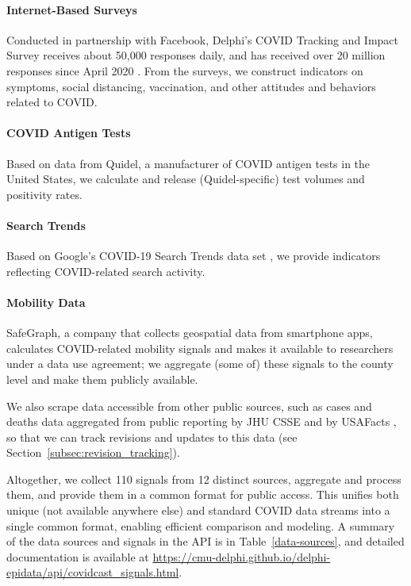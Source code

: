 \documentclass[9pt,twocolumn,twoside,lineno]{pnas-new}
\begin{document}
\paragraph{Internet-Based Surveys} Conducted in partnership with Facebook,
Delphi's COVID Tracking and Impact Survey receives about 50,000 responses daily,  
and has received over 20 million responses since April 2020 \cite{DelphiSurvey,
  Kreuter:2020}. From the surveys, we construct indicators on symptoms, social 
distancing, vaccination, and other attitudes and behaviors related to COVID.

\paragraph{COVID Antigen Tests} Based on data from Quidel, a manufacturer of
COVID antigen tests in the United States, we calculate and release
(Quidel-specific) test volumes and positivity rates.  

\paragraph{Search Trends} Based on Google's COVID-19 Search Trends data set
\cite{GoogleSymptoms}, we provide indicators reflecting COVID-related search  
activity.

\paragraph{Mobility Data} SafeGraph, a company that collects geospatial data
from smartphone apps, calculates COVID-related mobility signals
\cite{SafeGraphSD, SafeGraphPatterns} and makes it available to researchers
under a data use agreement; we aggregate (some of) these signals to the county
level and make them publicly available.     

\medskip
We also scrape data accessible from other public sources, such as cases and
deaths data aggregated from public reporting by JHU CSSE \cite{Dong:2020} and by
USAFacts \cite{USAFacts}, so that we can track revisions and updates to this data
(see Section~\ref{subsec:revision_tracking}).

Altogether, we collect 110 signals from 12 distinct sources, aggregate and
process them, and provide them in a common format for public access. This
unifies both unique (not available anywhere else) and standard COVID data
streams into a single common format, enabling efficient comparison and modeling.
A summary of the data sources and signals in the API is in
Table~\ref{data-sources}, and detailed documentation is available at
\url{https://cmu-delphi.github.io/delphi-epidata/api/covidcast_signals.html}.
\end{document}
